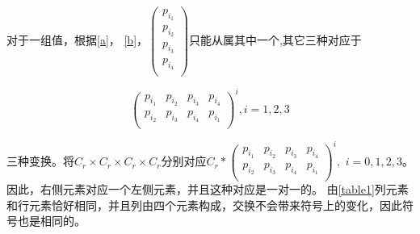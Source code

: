 \documentclass{amsc}          %
\numberwithin{equation}{section} %
\begin{document}
\begin{prof}
对于一组值，根据\ref{a}， \ref{b}，$\left(
  \begin{array}{ccc}   %
    p_{i_{1}} \\  %
    p_{i_{2}} \\  %
    p_{i_{3}} \\
    p_{i_{4}} \\
  \end{array}              %
    \right)$只能从属其中一个,其它三种对应于

    $$\left(
  \begin{array}{cccc}   %
    p_{i_{1}} & p_{i_{2}}& p_{i_{3}} & p_{i_{4}}\\  %
    p_{i_{2}} & p_{i_{3}}& p_{i_{4}}& p_{i_{1}}\\  %
  \end{array}\right)^{i},i=1,2,3$$

  三种变换。将$C_{r} \times C_{r}\times C_{r} \times C_{r}$分别对应$C_{r}*\left(
  \begin{array}{cccc}   %
    p_{i_{1}} & p_{i_{2}}& p_{i_{3}} & p_{i_{4}}\\  %
    p_{i_{2}} & p_{i_{3}}& p_{i_{4}}& p_{i_{1}}\\  %
  \end{array}              %
    \right)^{i},$ $i=0,1,2,3$。
因此，右侧元素对应一个左侧元素，并且这种对应是一对一的。
由\ref{table1}列元素和行元素恰好相同，并且列由四个元素构成，交换不会带来符号上的变化，因此符号也是相同的。


\end{prof}
\end{document}
